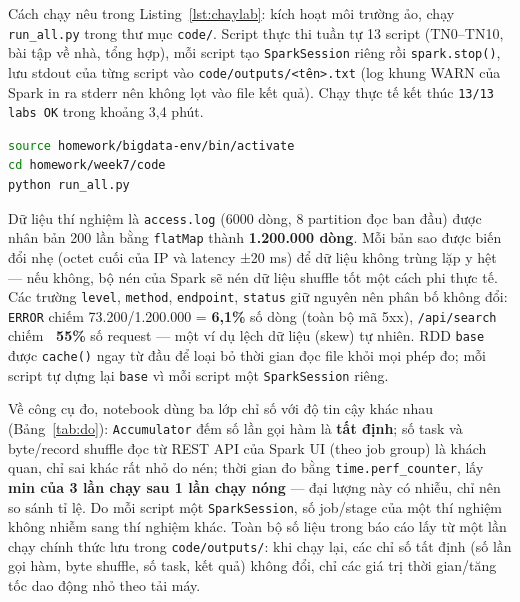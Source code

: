 \documentclass[12pt,a4paper,oneside]{article}
\begin{document}
Cách chạy nêu trong Listing~\ref{lst:chaylab}: kích hoạt môi trường ảo, chạy \texttt{run\_all.py} trong thư mục \texttt{code/}. Script thực thi tuần tự 13 script (TN0--TN10, bài tập về nhà, tổng hợp), mỗi script tạo \texttt{SparkSession} riêng rồi \texttt{spark.stop()}, lưu stdout của từng script vào \texttt{code/outputs/<tên>.txt} (log khung WARN của Spark in ra stderr nên không lọt vào file kết quả). Chạy thực tế kết thúc \texttt{13/13 labs OK} trong khoảng 3,4 phút.

\begin{lstlisting}[language=bash, caption={Lệnh kích hoạt môi trường và chạy toàn bộ thí nghiệm}, label={lst:chaylab}]
source homework/bigdata-env/bin/activate
cd homework/week7/code
python run_all.py
\end{lstlisting}

Dữ liệu thí nghiệm là \texttt{access.log} (6000 dòng, 8 partition đọc ban đầu) được nhân bản 200 lần bằng \texttt{flatMap} thành \textbf{1.200.000 dòng}. Mỗi bản sao được biến đổi nhẹ (octet cuối của IP và latency ±20 ms) để dữ liệu không trùng lặp y hệt --- nếu không, bộ nén của Spark sẽ nén dữ liệu shuffle tốt một cách phi thực tế. Các trường \texttt{level}, \texttt{method}, \texttt{endpoint}, \texttt{status} giữ nguyên nên phân bố không đổi: \texttt{ERROR} chiếm 73.200/1.200.000 = \textbf{6,1\%} số dòng (toàn bộ mã 5xx), \texttt{/api/search} chiếm \textbf{~55\%} số request --- một ví dụ lệch dữ liệu (skew) tự nhiên. RDD \texttt{base} được \texttt{cache()} ngay từ đầu để loại bỏ thời gian đọc file khỏi mọi phép đo; mỗi script tự dựng lại \texttt{base} vì mỗi script một \texttt{SparkSession} riêng.

Về công cụ đo, notebook dùng ba lớp chỉ số với độ tin cậy khác nhau (Bảng~\ref{tab:do}): \texttt{Accumulator} đếm số lần gọi hàm là \textbf{tất định}; số task và byte/record shuffle đọc từ REST API của Spark UI (theo job group) là khách quan, chỉ sai khác rất nhỏ do nén; thời gian đo bằng \texttt{time.perf\_counter}, lấy \textbf{min của 3 lần chạy sau 1 lần chạy nóng} --- đại lượng này có nhiễu, chỉ nên so sánh tỉ lệ. Do mỗi script một \texttt{SparkSession}, số job/stage của một thí nghiệm không nhiễm sang thí nghiệm khác. Toàn bộ số liệu trong báo cáo lấy từ một lần chạy chính thức lưu trong \texttt{code/outputs/}: khi chạy lại, các chỉ số tất định (số lần gọi hàm, byte shuffle, số task, kết quả) không đổi, chỉ các giá trị thời gian/tăng tốc dao động nhỏ theo tải máy.
\end{document}
